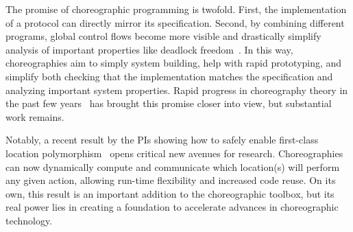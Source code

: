 The promise of choreographic programming is twofold.
First, the implementation of a protocol can directly mirror its specification.
Second, by combining different programs, global control flows become more visible
and drastically simplify analysis of important properties like deadlock freedom~\citep{CarboneM13}.
In this way, choreographies aim to simply system building, help with rapid prototyping,
and simplify both checking that the implementation matches the specification
and analyzing important system properties.
Rapid progress in choreography theory in the past few years~\citep[e.g.,][]{HirschG22,CruzFilipeGLMP22,CruzFilipeGLMP23,BatesK+25,SamuelsonHC25}
has brought this promise closer into view, but substantial work remains.


Notably, a recent result by the PIs showing how to safely enable first-class location polymorphism~\citep{SamuelsonHC25} opens critical new avenues for research.
Choreographies can now dynamically compute and communicate which location(s) will perform any given action,
allowing run-time flexibility and increased code reuse.
On its own, this result is an important addition to the choreographic toolbox,
but its real power lies in creating a foundation to accelerate advances in choreographic technology.

